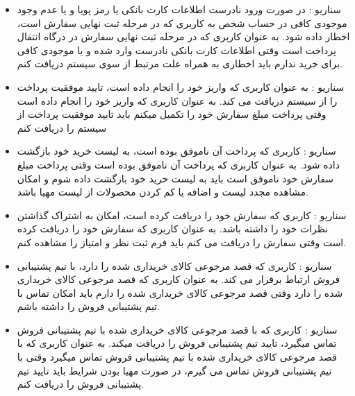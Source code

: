 \documentclass[14pt]{article}
\begin{document}
\begin{flushright}
\begin{itemize}
\item سناریو : در صورت ورود نادرست اطلاعات کارت بانکی یا رمز پویا و یا عدم وجود موجودی کافی در حساب شخص به کاربری که در مرحله ثبت نهایی سفارش است، اخطار داده شود.
\newline
به عنوان کاربری که در مرحله ثبت نهایی سفارش در درگاه انتقال پرداخت است
\newline
وقتی اطلاعات کارت بانکی نادرست وارد شده و یا موجودی کافی برای خرید ندارم
\newline
باید اخطاری به همراه علت مرتبط از سوی سیستم دریافت کنم.

\item سناریو : به عنوان کاربری که واریز خود را انجام داده است، تایید موفقیت پرداخت را از سیستم دریافت می کند.
\newline
به عنوان کاربری که واریز خود را انجام داده است
\newline
وقتی پرداخت مبلغ سفارش خود را تکمیل میکنم
\newline
باید تایید موفقیت پرداخت از سیستم را دریافت کنم

\item سناریو : کاربری که پرداخت آن ناموفق بوده است، به لیست خرید خود بازگشت داده شود.
\newline
به عنوان کاربری که پرداخت آن ناموفق بوده است
\newline
وقتی پرداخت مبلغ سفارش خود ناموفق است
\newline
باید به لیست خرید خود بازگشت داده شوم و امکان مشاهده مجدد لیست و اضافه یا کم کردن محصولات از لیست مهیا باشد.

\item سناریو : کاربری که سفارش خود را دریافت کرده است، امکان به اشتراک گذاشتن نظرات خود را داشته باشد.
\newline
به عنوان کاربری که سفارش خود را دریافت کرده است
\newline
وقتی سفارش را دریافت می کنم
\newline
باید فرم ثبت نظر و امتیاز را مشاهده کنم.

\item سناریو : کاربری که قصد مرجوعی کالای خریداری شده را دارد، با تیم پشتیبانی فروش ارتباط برقرار می کند.
\newline
به عنوان کاربری که قصد مرجوعی کالای خریداری شده را دارد
\newline
وقتی قصد مرجوعی کالای خریداری شده را دارم
\newline
باید امکان تماس با تیم پشتیبانی فروش را داشته باشم.

\item سناریو : کاربری که با قصد مرجوعی کالای خریداری شده با تیم پشتیبانی فروش تماس میگیرد، تایید تیم پشتیبانی فروش را دریافت میکند.
\newline
به عنوان کاربری که با قصد مرجوعی کالای خریداری شده با تیم پشتیبانی فروش تماس میگیرد
\newline
وقتی با تیم پشتیبانی فروش تماس می گیرم، در صورت مهیا بودن شرایط
\newline
باید تایید تیم پشتیبانی فروش را دریافت کنم.


\end{itemize}
\end{flushright}
\end{document}
